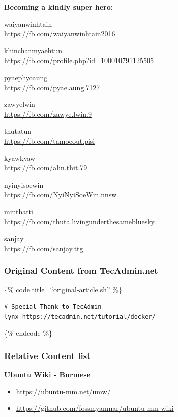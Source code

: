 \documentclass{article}
\begin{document}
\textbf{Becoming a kindly super hero:}

waiyanwinhtain\\\url{https://fb.com/waiyanwinhtain2016}

khinchanmyaehtun\\\url{https://fb.com/profile.php?id=100010791125505}

pyaephyoaung\\\url{https://fb.com/pyae.aung.7127}

zawyelwin\\\url{https://fb.com/zawye.lwin.9}

thutatun\\\url{https://fb.com/tamoeout.pisi}

kyawkyaw\\\url{https://fb.com/alin.thit.79}

nyinyisoewin\\\url{https://fb.com/NyiNyiSoeWin.nnsw}

minthatti\\\url{https://fb.com/thuta.livingunderthesamebluesky}

sanjay\\\url{https://fb.com/sanjay.ttg}

\subsubsection{Original Content from
TecAdmin.net}\label{original-content-from-tecadmin.net}

\{\% code title=``original-article.sh'' \%\}

\begin{verbatim}
# Special Thank to TecAdmin
lynx https://tecadmin.net/tutorial/docker/
\end{verbatim}

\{\% endcode \%\}

\subsubsection{Relative Content list}\label{relative-content-list}

\textbf{Ubuntu Wiki - Burmese}

\begin{itemize}
\itemsep1pt\parskip0pt
\item
  \url{https://ubuntu-mm.net/umw/}
\item
  \url{https://github.com/fossmyanmar/ubuntu-mm-wiki}
\end{itemize}
\end{document}
